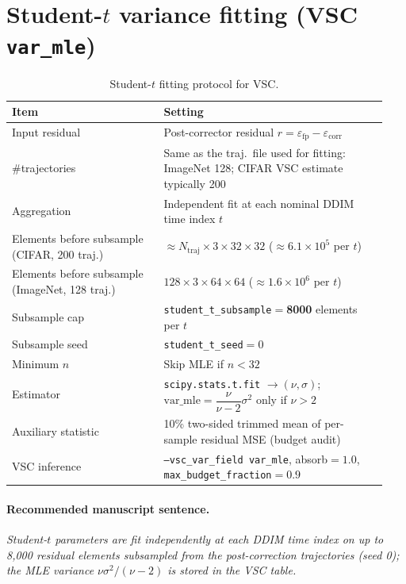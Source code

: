 \documentclass[11pt]{article}
\begin{document}
\section{Student-$t$ variance fitting (VSC \texttt{var\_mle})}

\begin{table}[t]
\centering
\caption{Student-$t$ fitting protocol for VSC.}
\label{tab:studentt}
\begin{tabular}{@{}p{0.38\linewidth}p{0.56\linewidth}@{}}
\toprule
\textbf{Item} & \textbf{Setting} \\
\midrule
Input residual
  & Post-corrector residual $r=\varepsilon_{\mathrm{fp}}-\varepsilon_{\mathrm{corr}}$ \\
\#trajectories
  & Same as the traj.\ file used for fitting: ImageNet 128; CIFAR VSC estimate typically 200 \\
Aggregation
  & Independent fit at each nominal DDIM time index $t$ \\
Elements before subsample (CIFAR, 200 traj.)
  & $\approx N_{\mathrm{traj}}\times 3\times 32\times 32$ ($\approx 6.1\times 10^{5}$ per $t$) \\
Elements before subsample (ImageNet, 128 traj.)
  & $128\times 3\times 64\times 64$ ($\approx 1.6\times 10^{6}$ per $t$) \\
Subsample cap
  & \texttt{student\_t\_subsample}${}={}$\textbf{8000} elements per $t$ \\
Subsample seed
  & \texttt{student\_t\_seed}${}={}$0 \\
Minimum $n$
  & Skip MLE if $n<32$ \\
Estimator
  & \texttt{scipy.stats.t.fit} $\rightarrow (\nu,\sigma)$;
    $\mathrm{var\_mle}=\dfrac{\nu}{\nu-2}\sigma^{2}$ only if $\nu>2$ \\
Auxiliary statistic
  & 10\% two-sided trimmed mean of per-sample residual MSE (budget audit) \\
VSC inference
  & \texttt{--vsc\_var\_field var\_mle}, absorb${=}1.0$, \texttt{max\_budget\_fraction}${=}0.9$ \\
\bottomrule
\end{tabular}
\end{table}

\paragraph{Recommended manuscript sentence.}
\emph{Student-$t$ parameters are fit independently at each DDIM time index on up to 8{,}000 residual elements subsampled from the post-correction trajectories (seed 0); the MLE variance $\nu\sigma^{2}/(\nu-2)$ is stored in the VSC table.}
\end{document}
